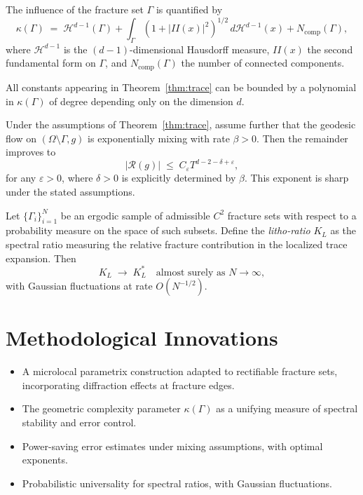 \begin{definition}
\label{def:complexity}
The influence of the fracture set $\Gamma$ is quantified by
\[
\kappa(\Gamma) \;=\; 
    \mathcal{H}^{d-1}(\Gamma)
    + \int_\Gamma \!\!(1+|II(x)|^2)^{1/2}\,d\mathcal{H}^{d-1}(x) 
    + N_{\mathrm{comp}}(\Gamma),
\]
where $\mathcal{H}^{d-1}$ is the $(d-1)$-dimensional Hausdorff measure, 
$II(x)$ the second fundamental form on $\Gamma$, 
and $N_{\mathrm{comp}}(\Gamma)$ the number of connected components.
\end{definition}

\begin{proposition}
\label{prop:polynomial}
All constants appearing in Theorem~\ref{thm:trace} can be bounded by a polynomial 
in $\kappa(\Gamma)$ of degree depending only on the dimension $d$.
\end{proposition}

\begin{theorem}
\label{thm:refinements}
Under the assumptions of Theorem~\ref{thm:trace}, assume further that the 
geodesic flow on $(\Omega\setminus\Gamma,g)$ is exponentially mixing with rate $\beta>0$. 
Then the remainder improves to
\[
|\mathcal{R}(g)| \;\leq\; C_\varepsilon T^{d-2-\delta+\varepsilon},
\]
for any $\varepsilon>0$, where $\delta>0$ is explicitly determined by $\beta$. 
This exponent is sharp under the stated assumptions.
\end{theorem}

\begin{theorem}
\label{thm:litho-ratio}
Let $\{ \Gamma_i \}_{i=1}^N$ be an ergodic sample of admissible $C^2$ fracture sets 
with respect to a probability measure on the space of such subsets. 
Define the \emph{litho-ratio} $K_L$ as the spectral ratio measuring the 
relative fracture contribution in the localized trace expansion. 
Then
\[
K_L \;\to\; K_L^* \quad \text{almost surely as } N\to\infty,
\]
with Gaussian fluctuations at rate $O(N^{-1/2})$.
\end{theorem}

\section*{Methodological Innovations}

\begin{itemize}
    \item A microlocal parametrix construction adapted to rectifiable fracture sets, 
    incorporating diffraction effects at fracture edges.
    \item The geometric complexity parameter $\kappa(\Gamma)$ as a unifying measure 
    of spectral stability and error control.
    \item Power-saving error estimates under mixing assumptions, with optimal exponents.
    \item Probabilistic universality for spectral ratios, with Gaussian fluctuations.
\end{itemize}


